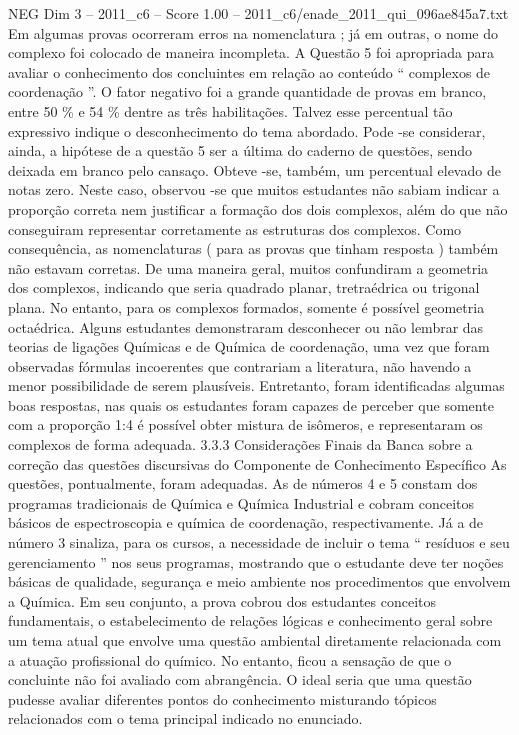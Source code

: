 \begin{textsample}{NEG Dim 3 – 2011\_c6 – Score 1.00 – 2011\_c6/enade\_2011\_qui\_096ae845a7.txt}
Em algumas provas ocorreram erros na nomenclatura ; já em outras, o nome do complexo foi colocado de maneira incompleta.
A Questão 5 foi apropriada para avaliar o conhecimento dos concluintes em relação ao conteúdo “ complexos de coordenação ”.
O fator negativo foi a grande quantidade de provas em branco, entre 50 \% e 54 \% dentre as três habilitações.
Talvez esse percentual tão expressivo indique o desconhecimento do tema abordado.
Pode -se considerar, ainda, a hipótese de a questão 5 ser a última do caderno de questões, sendo deixada em branco pelo cansaço.
Obteve -se, também, um percentual elevado de notas zero.
Neste caso, observou -se que muitos estudantes não sabiam indicar a proporção correta nem justificar a formação dos dois complexos, além do que não conseguiram representar corretamente as estruturas dos complexos.
Como consequência, as nomenclaturas ( para as provas que tinham resposta ) também não estavam corretas.
De uma maneira geral, muitos confundiram a geometria dos complexos, indicando que seria quadrado planar, tretraédrica ou trigonal plana.
No entanto, para os complexos formados, somente é possível geometria octaédrica.
Alguns estudantes demonstraram desconhecer ou não lembrar das teorias de ligações Químicas e de Química de coordenação, uma vez que foram observadas fórmulas incoerentes que contrariam a literatura, não havendo a menor possibilidade de serem plausíveis.
Entretanto, foram identificadas algumas boas respostas, nas quais os estudantes foram capazes de perceber que somente com a proporção 1:4 é possível obter mistura de isômeros, e representaram os complexos de forma adequada. 3.3.3 Considerações Finais da Banca sobre a correção das questões discursivas do Componente de Conhecimento Específico As questões, pontualmente, foram adequadas.
As de números 4 e 5 constam dos programas tradicionais de Química e Química Industrial e cobram conceitos básicos de espectroscopia e química de coordenação, respectivamente.
Já a de número 3 sinaliza, para os cursos, a necessidade de incluir o tema “ resíduos e seu gerenciamento ” nos seus programas, mostrando que o estudante deve ter noções básicas de qualidade, segurança e meio ambiente nos procedimentos que envolvem a Química.
Em seu conjunto, a prova cobrou dos estudantes conceitos fundamentais, o estabelecimento de relações lógicas e conhecimento geral sobre um tema atual que envolve uma questão ambiental diretamente relacionada com a atuação profissional do químico.
No entanto, ficou a sensação de que o concluinte não foi avaliado com abrangência.
O ideal seria que uma questão pudesse avaliar diferentes pontos do conhecimento misturando tópicos relacionados com o tema principal indicado no enunciado.

\end{textsample}

